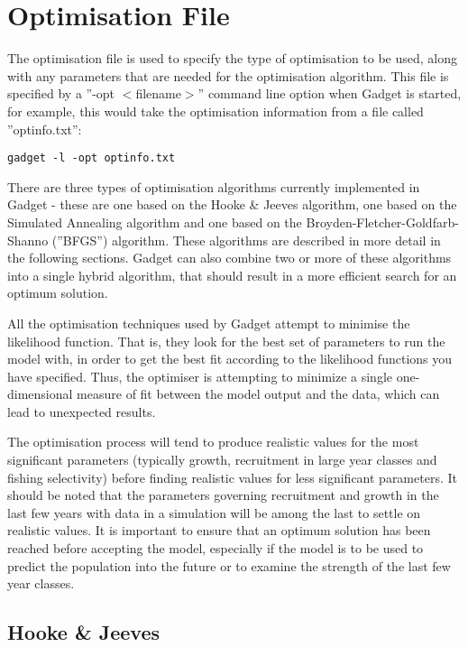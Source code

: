 \documentclass [a4paper, 10pt]{book}
\begin{document}
\chapter{Optimisation File}\label{chap:optim}
The optimisation file is used to specify the type of optimisation to be used, along with any parameters that are needed for the optimisation algorithm.  This file is specified by a ''-opt $<$filename$>$'' command line option when Gadget is started, for example, this would take the optimisation information from a file called ''optinfo.txt'':

{\small\begin{verbatim}
gadget -l -opt optinfo.txt
\end{verbatim}}

There are three types of optimisation algorithms currently implemented in Gadget - these are one based on the Hooke \& Jeeves algorithm, one based on the Simulated Annealing algorithm and one based on the Broyden-Fletcher-Goldfarb-Shanno (''BFGS'') algorithm.  These algorithms are described in more detail in the following sections.  Gadget can also combine two or more of these algorithms into a single hybrid algorithm, that should result in a more efficient search for an optimum solution.

\bigskip
All the optimisation techniques used by Gadget attempt to minimise the likelihood function. That is, they look for the best set of parameters to run the model with, in order to get the best fit according to the likelihood functions you have specified.  Thus, the optimiser is attempting to minimize a single one-dimensional measure of fit between the model output and the data, which can lead to unexpected results.

\bigskip
The optimisation process will tend to produce realistic values for the most significant parameters (typically growth, recruitment in large year classes and fishing selectivity) before finding realistic values for less significant parameters.  It should be noted that the parameters governing recruitment and growth in the last few years with data in a simulation will be among the last to settle on realistic values.  It is important to ensure that an optimum solution has been reached before accepting the model, especially if the model is to be used to predict the population into the future or to examine the strength of the last few year classes.

\section{Hooke \& Jeeves}\label{sec:hooke}
\end{document}
